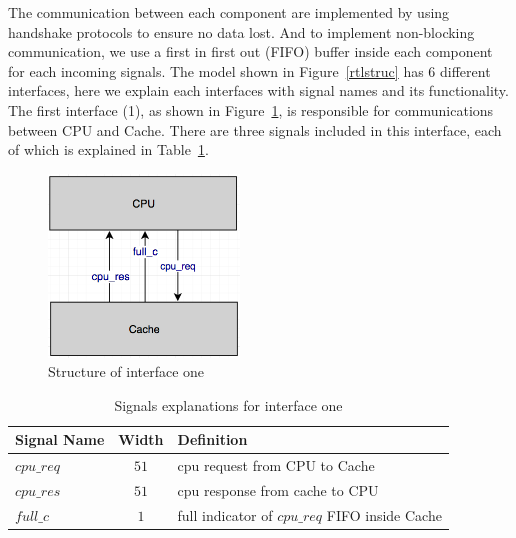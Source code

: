 \documentclass[12pt,frontmatter,copyright,thesis]{usfmanus}
\begin{document}
The communication between each component are implemented by using handshake protocols to ensure no
data lost. And to implement non-blocking communication, we use
a first in first out (FIFO) buffer inside each component for each incoming signals.
The model shown in Figure~\ref{rtlstruc} has 6 different interfaces, here we explain each interfaces
with signal names and its functionality.
The first interface (1), as shown in Figure~\ref{int1}, is responsible for communications between CPU and Cache.
There are three signals included in this interface, each of which is explained in Table~\ref{int1t}.
\begin{figure}[h]
\centering
    \includegraphics[width=2in]{int1.png}
    \caption{Structure of interface one}
    \label{int1}
 \end{figure}

\begin{table}[h]
\caption{Signals explanations for interface one}

\begin{tabular}{|l|c | p{12cm} |}
\hline
Signal Name & Width & Definition \\
\hline
\hline
$cpu\_req$ 		&$51$			& cpu request from CPU to Cache \\
\hline
$cpu\_res$ 		&$51$			& cpu response from cache to CPU \\
\hline
$full\_c$ 			&$1$				& full indicator of $cpu\_req$ FIFO inside Cache\\
\hline
\end{tabular}
\label{int1t}
\end{table}
\end{document}
